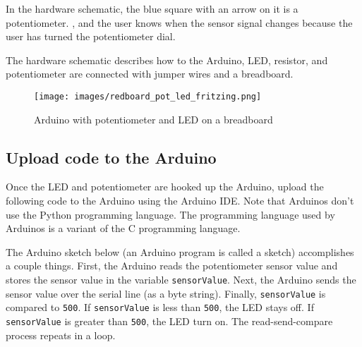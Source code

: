 \documentclass{book}
\makeatletter
\def\maxwidth{\ifdim\Gin@nat@width>\linewidth\linewidth
\else\Gin@nat@width\fi}
\let\Oldincludegraphics\includegraphics
\renewcommand{\includegraphics}[1]{\Oldincludegraphics[width=.8\maxwidth]{#1}}
\newcommand{\passthrough}[1]{#1}
\makeatother
\begin{document}
In the hardware schematic, the blue square with an arrow on it is a
potentiometer. , and the user knows when the sensor signal changes
because the user has turned the potentiometer dial.

The hardware schematic describes how to the Arduino, LED, resistor, and
potentiometer are connected with jumper wires and a breadboard.
    




    
        \begin{figure}
\centering
\texttt{[image: images/redboard\_pot\_led\_fritzing.png]}
\caption{Arduino with potentiometer and LED on a breadboard}
\end{figure}
    




    
        \hypertarget{upload-code-to-the-arduino}{%
\subsection{Upload code to the
Arduino}\label{upload-code-to-the-arduino}}
    




    
        Once the LED and potentiometer are hooked up the Arduino, upload the
following code to the Arduino using the Arduino IDE. Note that Arduinos
don't use the Python programming language. The programming language used
by Arduinos is a variant of the C programming language.

The Arduino sketch below (an Arduino program is called a sketch)
accomplishes a couple things. First, the Arduino reads the potentiometer
sensor value and stores the sensor value in the variable
\passthrough{\lstinline!sensorValue!}. Next, the Arduino sends the
sensor value over the serial line (as a byte string). Finally,
\passthrough{\lstinline!sensorValue!} is compared to
\passthrough{\lstinline!500!}. If \passthrough{\lstinline!sensorValue!}
is less than \passthrough{\lstinline!500!}, the LED stays off. If
\passthrough{\lstinline!sensorValue!} is greater than
\passthrough{\lstinline!500!}, the LED turn on. The read-send-compare
process repeats in a loop.
    
\end{document}
